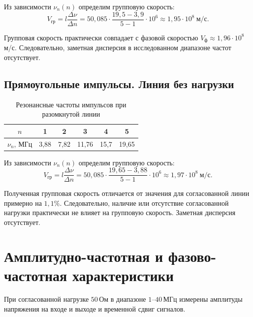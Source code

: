 \documentclass[a4paper,14pt]{extarticle}
\begin{document}
Из зависимости $\nu_n(n)$ определим групповую скорость:
\begin{equation}
    V_{\text{гр}} = l\frac{\Delta \nu}{\Delta n}
    = 50{,}085 \cdot
    \frac{19{,}5 - 3{,}9}{5 - 1} \cdot 10^6
    \approx 1{,}95 \cdot 10^8 \ \text{м/с}.
\end{equation}

Групповая скорость практически совпадает с фазовой
скоростью $V_{\text{ф}} \approx 1{,}96 \cdot 10^8$ м/с.
Следовательно, заметная дисперсия в исследованном
диапазоне частот отсутствует.

\subsection{Прямоугольные импульсы. Линия без нагрузки}
\begin{table}[H]
    \centering
    \caption{Резонансные частоты импульсов при разомкнутой линии}
    \begin{tabular}{cccccc}
        \toprule
        $n$ & 1 & 2 & 3 & 4 & 5\\
        \midrule
        $\nu_n$, МГц & 3,88 & 7,82 & 11,76 & 15,7 & 19,65\\
        \bottomrule
    \end{tabular}
\end{table}

Из зависимости $\nu_n(n)$ определим групповую скорость:
\begin{equation}
    V_{\text{гр}} = l\frac{\Delta \nu}{\Delta n}
    = 50{,}085 \cdot
    \frac{19{,}65 - 3{,}88}{5 - 1} \cdot 10^6
    \approx 1{,}97 \cdot 10^8 \ \text{м/с}.
\end{equation}

Полученная групповая скорость отличается от значения
для согласованной линии примерно на $1{,}1\%$.
Следовательно, наличие или отсутствие согласованной
нагрузки практически не влияет на групповую скорость.
Заметная дисперсия отсутствует.

\newpage

\section{Амплитудно-частотная и фазово-частотная характеристики}

При согласованной нагрузке $50\,\text{Ом}$ в диапазоне
$1$--$40\,\text{МГц}$ измерены амплитуды напряжения на входе
и выходе и временной сдвиг сигналов.
\end{document}
